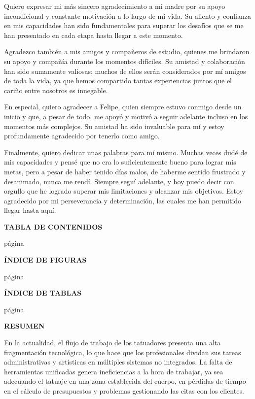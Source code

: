\documentclass[12pt,letterpaper,oneside]{report}
\makeatletter
\newcommand{\titulopreliminar}[1]{%
  \begin{center}\textbf{#1}\end{center}}
\newcommand{\rotulopagina}[1]{\par\vspace{-5.69pt}\hfill página\par#1}
\newcommand{\indice}[3]{%
  \titulopreliminar{#1}\rotulopagina{#3}{\setlength{\parskip}{0pt}\@starttoc{#2}}}
\renewcommand{\tableofcontents}{\indice{TABLA DE CONTENIDOS}{toc}{\vspace{13pt}}}
\renewcommand{\listoffigures}{\indice{ÍNDICE DE FIGURAS}{lof}{\vskip13pt}}
\renewcommand{\listoftables}{\indice{ÍNDICE DE TABLAS}{lot}{\vskip13pt}}
\makeatother
\begin{document}
Quiero expresar mi más sincero agradecimiento a mi madre por su apoyo incondicional y constante motivación a lo largo de mi vida. Su aliento y confianza en mis capacidades han sido fundamentales para superar los desafíos que se me han presentado en cada etapa hasta llegar a este momento.



Agradezco también a mis amigos y compañeros de estudio, quienes me brindaron su apoyo y compañía durante los momentos difíciles. Su amistad y colaboración han sido sumamente valiosas; muchos de ellos serán considerados por mí amigos de toda la vida, ya que hemos compartido tantas experiencias juntos que el cariño entre nosotros es innegable.

En especial, quiero agradecer a Felipe, quien siempre estuvo conmigo desde un inicio y que, a pesar de todo, me apoyó y motivó a seguir adelante incluso en los momentos más complejos. Su amistad ha sido invaluable para mí y estoy profundamente agradecido por tenerlo como amigo.

Finalmente, quiero dedicar unas palabras para mí mismo. Muchas veces dudé de mis capacidades y pensé que no era lo suficientemente bueno para lograr mis metas, pero a pesar de haber tenido días malos, de haberme sentido frustrado y desanimado, nunca me rendí. Siempre seguí adelante, y hoy puedo decir con orgullo que he logrado superar mis limitaciones y alcanzar mis objetivos. Estoy agradecido por mi perseverancia y determinación, las cuales me han permitido llegar hasta aquí.





\newpage

\thispagestyle{plain}
\tableofcontents
\newpage

\thispagestyle{plain}
\listoffigures
\newpage

\thispagestyle{plain}
\listoftables
\newpage

\thispagestyle{plain}
\titulopreliminar{RESUMEN}
\vspace{10.75pt}

En la actualidad, el flujo de trabajo de los tatuadores presenta una alta fragmentación tecnológica, lo que hace que los profesionales dividan sus tareas administrativas y artísticas en múltiples sistemas no integrados. La falta de herramientas unificadas genera ineficiencias a la hora de trabajar, ya sea adecuando el tatuaje en una zona establecida del cuerpo, en pérdidas de tiempo en el cálculo de presupuestos y problemas gestionando las citas con los clientes.
\end{document}
